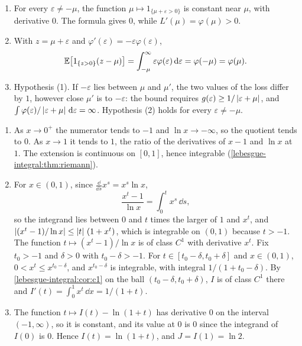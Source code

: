 \begin{enumerate}[nosep]
  \item For every $\varepsilon\neq-\mu$, the function
        $\mu\mapsto1_{\{\mu + \varepsilon > 0\}}$ is constant near
        $\mu$, with derivative $0$. The formula gives $0$, while
        $L'(\mu) = \varphi(\mu) > 0$.
  \item With $z = \mu + \varepsilon$ and
        $\varphi'(\varepsilon) = -\varepsilon\varphi(\varepsilon)$,
        \[
          \mathbb{E}\bigl[1_{\{z > 0\}}(z - \mu)\bigr]
          = \int_{-\mu}^\infty\varepsilon\varphi(\varepsilon)\,
            \mathrm{d}\varepsilon
          = \varphi(-\mu) = \varphi(\mu) .
        \]
  \item Hypothesis (1). If $-\varepsilon$ lies between $\mu$ and
        $\mu'$, the two values of the loss differ by $1$, however close
        $\mu'$ is to $-\varepsilon$: the bound requires
        $g(\varepsilon)\geq1/\left|\varepsilon + \mu\right|$, and
        $\int\varphi(\varepsilon)/\left|\varepsilon + \mu\right|\,\mathrm{d}\varepsilon
        = \infty$. Hypothesis (2) holds for every
        $\varepsilon\neq-\mu$.
\end{enumerate}

\begin{enumerate}[nosep]
  \item As $x\to0^+$ the numerator tends to $-1$ and $\ln x\to-\infty$,
        so the quotient tends to $0$. As $x\to1$ it tends to $1$, the
        ratio of the derivatives of $x - 1$ and $\ln x$ at $1$. The
        extension is continuous on $[0, 1]$, hence integrable
        (\cref{lebesgue-integral:thm:riemann}).
  \item For $x\in(0, 1)$, since $\frac{\dd}{\dd s}x^s = x^s\ln x$,
        \[
          \frac{x^t - 1}{\ln x} = \int_0^tx^s\,\dd s ,
        \]
        so the integrand lies between $0$ and $t$ times the larger of
        $1$ and $x^t$, and
        $\left|(x^t - 1)/\ln x\right|\leq\left|t\right|\,(1 + x^t)$, which is
        integrable on $(0, 1)$ because $t > -1$. The function
        $t\mapsto(x^t - 1)/\ln x$ is of class $C^1$ with derivative
        $x^t$. Fix $t_0 > -1$ and $\delta > 0$ with $t_0 - \delta > -1$.
        For $t\in[t_0 - \delta, t_0 + \delta]$ and $x\in(0, 1)$,
        $0 < x^t\leq x^{t_0 - \delta}$, and $x^{t_0 - \delta}$ is
        integrable, with integral $1/(1 + t_0 - \delta)$. By
        \cref{lebesgue-integral:cor:c1} on the ball
        $(t_0 - \delta, t_0 + \delta)$, $I$ is of class $C^1$ there and
        $I'(t) = \int_0^1x^t\,\dd x = 1/(1 + t)$.
  \item The function $t\mapsto I(t) - \ln(1 + t)$ has derivative $0$
        on the interval $(-1, \infty)$, so it is constant, and its
        value at $0$ is $0$ since the integrand of $I(0)$ is $0$. Hence
        $I(t) = \ln(1 + t)$, and $J = I(1) = \ln2$.
\end{enumerate}

